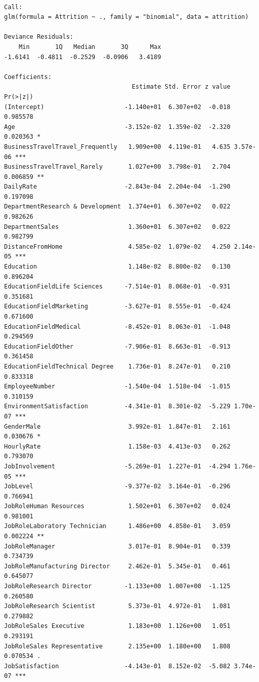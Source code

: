\documentclass[
  letterpaper,
  DIV=11,
  numbers=noendperiod]{scrreprt}
\theoremstyle{definition}
\theoremstyle{remark}
\begin{document}
\begin{verbatim}

Call:
glm(formula = Attrition ~ ., family = "binomial", data = attrition)

Deviance Residuals: 
    Min       1Q   Median       3Q      Max  
-1.6141  -0.4811  -0.2529  -0.0906   3.4189  

Coefficients:
                                   Estimate Std. Error z value Pr(>|z|)    
(Intercept)                      -1.140e+01  6.307e+02  -0.018 0.985578    
Age                              -3.152e-02  1.359e-02  -2.320 0.020363 *  
BusinessTravelTravel_Frequently   1.909e+00  4.119e-01   4.635 3.57e-06 ***
BusinessTravelTravel_Rarely       1.027e+00  3.798e-01   2.704 0.006859 ** 
DailyRate                        -2.843e-04  2.204e-04  -1.290 0.197098    
DepartmentResearch & Development  1.374e+01  6.307e+02   0.022 0.982626    
DepartmentSales                   1.360e+01  6.307e+02   0.022 0.982799    
DistanceFromHome                  4.585e-02  1.079e-02   4.250 2.14e-05 ***
Education                         1.148e-02  8.800e-02   0.130 0.896204    
EducationFieldLife Sciences      -7.514e-01  8.068e-01  -0.931 0.351681    
EducationFieldMarketing          -3.627e-01  8.555e-01  -0.424 0.671600    
EducationFieldMedical            -8.452e-01  8.063e-01  -1.048 0.294569    
EducationFieldOther              -7.906e-01  8.663e-01  -0.913 0.361458    
EducationFieldTechnical Degree    1.736e-01  8.247e-01   0.210 0.833318    
EmployeeNumber                   -1.540e-04  1.518e-04  -1.015 0.310159    
EnvironmentSatisfaction          -4.341e-01  8.301e-02  -5.229 1.70e-07 ***
GenderMale                        3.992e-01  1.847e-01   2.161 0.030676 *  
HourlyRate                        1.158e-03  4.413e-03   0.262 0.793070    
JobInvolvement                   -5.269e-01  1.227e-01  -4.294 1.76e-05 ***
JobLevel                         -9.377e-02  3.164e-01  -0.296 0.766941    
JobRoleHuman Resources            1.502e+01  6.307e+02   0.024 0.981001    
JobRoleLaboratory Technician      1.486e+00  4.858e-01   3.059 0.002224 ** 
JobRoleManager                    3.017e-01  8.904e-01   0.339 0.734739    
JobRoleManufacturing Director     2.462e-01  5.345e-01   0.461 0.645077    
JobRoleResearch Director         -1.133e+00  1.007e+00  -1.125 0.260580    
JobRoleResearch Scientist         5.373e-01  4.972e-01   1.081 0.279882    
JobRoleSales Executive            1.183e+00  1.126e+00   1.051 0.293191    
JobRoleSales Representative       2.135e+00  1.180e+00   1.808 0.070534 .  
JobSatisfaction                  -4.143e-01  8.152e-02  -5.082 3.74e-07 ***

\end{verbatim}
\end{document}
